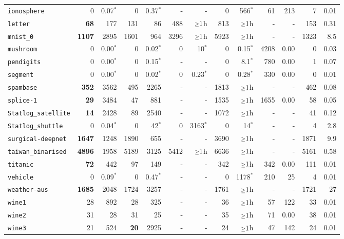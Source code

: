 \begin{tabular}{lrrrrrrrrrrrr}
\texttt{ionosphere} & 0 & 0.07$^*$ & 0 & 0.37$^*$ & - & - & 0 & 566$^*$ & 61 & 213 & 7 & 0.01\\
\texttt{letter} & \textbf{68} & 177 & 131 & 86 & 488 & $\mathsmaller{\geq}1$h & 813 & $\mathsmaller{\geq}1$h & - & - & 153 & 0.31\\
\texttt{mnist\_0} & \textbf{1107} & 2895 & 1601 & 964 & 3296 & $\mathsmaller{\geq}1$h & 5923 & $\mathsmaller{\geq}1$h & - & - & 1323 & 8.5\\
\texttt{mushroom} & 0 & 0.00$^*$ & 0 & 0.02$^*$ & 0 & 10$^*$ & 0 & 0.15$^*$ & 4208 & 0.00 & 0 & 0.03\\
\texttt{pendigits} & 0 & 0.00$^*$ & 0 & 0.15$^*$ & - & - & 0 & 8.1$^*$ & 780 & 0.00 & 1 & 0.07\\
\texttt{segment} & 0 & 0.00$^*$ & 0 & 0.02$^*$ & 0 & 0.23$^*$ & 0 & 0.28$^*$ & 330 & 0.00 & 0 & 0.01\\
\texttt{spambase} & \textbf{352} & 3562 & 495 & 2265 & - & - & 1813 & $\mathsmaller{\geq}1$h & - & - & 462 & 0.08\\
\texttt{splice-1} & \textbf{29} & 3484 & 47 & 881 & - & - & 1535 & $\mathsmaller{\geq}1$h & 1655 & 0.00 & 58 & 0.05\\
\texttt{Statlog\_satellite} & \textbf{14} & 2428 & 89 & 2540 & - & - & 1072 & $\mathsmaller{\geq}1$h & - & - & 41 & 0.12\\
\texttt{Statlog\_shuttle} & 0 & 0.04$^*$ & 0 & 42$^*$ & 0 & 3163$^*$ & 0 & 14$^*$ & - & - & 4 & 2.8\\
\texttt{surgical-deepnet} & \textbf{1647} & 1248 & 1890 & 655 & - & - & 3690 & $\mathsmaller{\geq}1$h & - & - & 1871 & 9.9\\
\texttt{taiwan\_binarised} & \textbf{4896} & 1958 & 5189 & 3125 & 5412 & $\mathsmaller{\geq}1$h & 6636 & $\mathsmaller{\geq}1$h & - & - & 5161 & 0.58\\
\texttt{titanic} & \textbf{72} & 442 & 97 & 149 & - & - & 342 & $\mathsmaller{\geq}1$h & 342 & 0.00 & 111 & 0.01\\
\texttt{vehicle} & 0 & 0.09$^*$ & 0 & 0.47$^*$ & - & - & 0 & 1178$^*$ & 210 & 25 & 4 & 0.01\\
\texttt{weather-aus} & \textbf{1685} & 2048 & 1724 & 3257 & - & - & 1761 & $\mathsmaller{\geq}1$h & - & - & 1721 & 27\\
\texttt{wine1} & 28 & 892 & 28 & 325 & - & - & 36 & $\mathsmaller{\geq}1$h & 57 & 122 & 33 & 0.01\\
\texttt{wine2} & 31 & 28 & 31 & 25 & - & - & 35 & $\mathsmaller{\geq}1$h & 71 & 0.00 & 38 & 0.01\\
\texttt{wine3} & 21 & 524 & \textbf{20} & 2925 & - & - & 24 & $\mathsmaller{\geq}1$h & 47 & 142 & 24 & 0.01\\
\bottomrule
\end{tabular}

